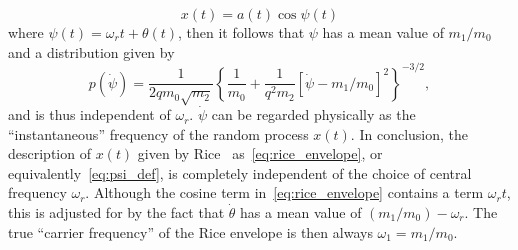 \documentclass[12pt]{article}
\theoremstyle{plain}
\theoremstyle{definition}
\theoremstyle{remark}
\begin{document}
\begin{equation}
    x(t) = a(t) \cos \psi(t)
    \label{eq:psi_def}
\end{equation}
where $\psi(t) = \omega_r t + \theta(t)$, then it follows that $\psi$ has a mean value of $m_1 / m_0$ and a distribution given by
\begin{equation}
    p(\dot{\psi}) = \frac{1}{2 q m_0 \sqrt{m_2}} \left\{ \frac{1}{m_0} + \frac{1}{q^2 m_2} [\dot{\psi} - m_1/m_0]^2 \right\}^{-3/2},
    \label{eq:psi_pdf}
\end{equation}
and is thus independent of $\omega_r$. $\dot{\psi}$ can be regarded physically as the ``instantaneous'' frequency of the random process $x(t)$. In conclusion, the description of $x(t)$ given by Rice~\cite{rice1954} as~\eqref{eq:rice_envelope}, or equivalently~\eqref{eq:psi_def}, is completely independent of the choice of central frequency $\omega_r$. Although the cosine term in~\eqref{eq:rice_envelope} contains a term $\omega_r t$, this is adjusted for by the fact that $\dot{\theta}$ has a mean value of $(m_1/m_0) - \omega_r$. The true ``carrier frequency'' of the Rice envelope is then always $\omega_1 = m_1 / m_0$.
\end{document}
